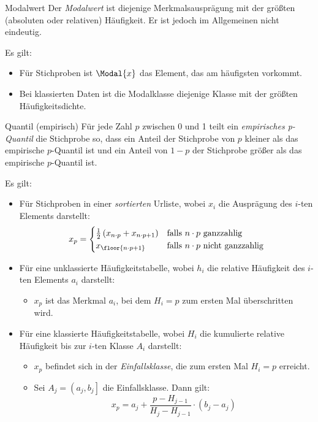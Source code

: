 \begin{defi}{Modalwert}
    Der \emph{Modalwert} ist diejenige Merkmalsausprägung mit der größten (absoluten oder relativen) Häufigkeit.
    Er ist jedoch im Allgemeinen nicht eindeutig.

    Es gilt:
    \begin{itemize}
        \item Für Stichproben ist $\Modal{x}$ das Element, das am häufigsten vorkommt.
        \item Bei klassierten Daten ist die Modalklasse diejenige Klasse mit der größten Häufigkeitsdichte.
    \end{itemize}
\end{defi}

\begin{defi}{Quantil (empirisch)}
    Für jede Zahl $p$ zwischen 0 und 1 teilt ein \emph{empirisches p-Quantil} die Stichprobe so, dass ein Anteil der Stichprobe von $p$ kleiner als das empirische $p$-Quantil ist und ein Anteil von $1-p$ der Stichprobe größer als das empirische $p$-Quantil ist.

    Es gilt:
    \begin{itemize}
        \item Für Stichproben in einer \emph{sortierten} Urliste, wobei $x_i$ die Ausprägung des $i$-ten Elements darstellt:
              \[
                  x_p =
                  \begin{cases}
                      \frac{1}{2} \left( x_{n \cdot p} + x_{n \cdot p + 1} \right) & \text{falls $n \cdot p$ ganzzahlig}       \\
                      x_{\floor{n \cdot p + 1}}                                    & \text{falls $n \cdot p$ nicht ganzzahlig} \\
                  \end{cases}
              \]
        \item Für eine unklassierte Häufigkeitstabelle, wobei $h_i$ die relative Häufigkeit des $i$-ten Elements $a_i$ darstellt:
              \begin{itemize}
                  \item $x_p$ ist das Merkmal $a_i$, bei dem $H_i = p$ zum ersten Mal überschritten wird.
              \end{itemize}
        \item Für eine klassierte Häufigkeitstabelle, wobei $H_i$ die kumulierte relative Häufigkeit bis zur $i$-ten Klasse $A_i$ darstellt:
              \begin{itemize}
                  \item $x_p$ befindet sich in der \emph{Einfallsklasse}, die zum ersten Mal $H_i = p$ erreicht.
                  \item Sei $A_j = \left( a_j, b_j \right]$ die Einfallsklasse.
                        Dann gilt:
                        \[
                            x_p = a_j + \frac{p - H_{j-1}}{H_{j} - H_{j-1}} \cdot (b_j - a_j)
                        \]
              \end{itemize}
    \end{itemize}
\end{defi}

